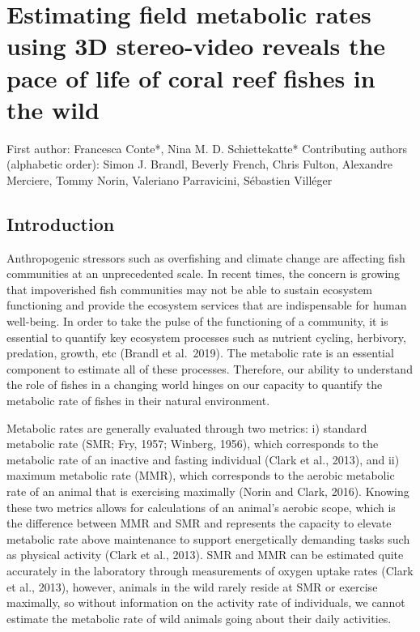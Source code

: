 \documentclass[12pt,a4paper]{article}
\begin{document}

\hypertarget{estimating-field-metabolic-rates-using-3d-stereo-video-reveals-the-pace-of-life-of-coral-reef-fishes-in-the-wild}{%
\section{Estimating field metabolic rates using 3D stereo-video reveals
the pace of life of coral reef fishes in the
wild}\label{estimating-field-metabolic-rates-using-3d-stereo-video-reveals-the-pace-of-life-of-coral-reef-fishes-in-the-wild}}

First author: Francesca Conte*, Nina M. D. Schiettekatte* Contributing
authors (alphabetic order): Simon J. Brandl, Beverly French, Chris
Fulton, Alexandre Merciere, Tommy Norin, Valeriano Parravicini,
Sébastien Villéger

\hypertarget{introduction}{%
\subsection{Introduction}\label{introduction}}

\noindent Anthropogenic stressors such as overfishing and climate change
are affecting fish communities at an unprecedented scale. In recent
times, the concern is growing that impoverished fish communities may not
be able to sustain ecosystem functioning and provide the ecosystem
services that are indispensable for human well-being. In order to take
the pulse of the functioning of a community, it is essential to quantify
key ecosystem processes such as nutrient cycling, herbivory, predation,
growth, etc (Brandl et al.~2019). The metabolic rate is an essential
component to estimate all of these processes. Therefore, our ability to
understand the role of fishes in a changing world hinges on our capacity
to quantify the metabolic rate of fishes in their natural environment.

\noindent Metabolic rates are generally evaluated through two metrics:
i) standard metabolic rate (SMR; Fry, 1957; Winberg, 1956), which
corresponds to the metabolic rate of an inactive and fasting individual
(Clark et al., 2013), and ii) maximum metabolic rate (MMR), which
corresponds to the aerobic metabolic rate of an animal that is
exercising maximally (Norin and Clark, 2016). Knowing these two metrics
allows for calculations of an animal's aerobic scope, which is the
difference between MMR and SMR and represents the capacity to elevate
metabolic rate above maintenance to support energetically demanding
tasks such as physical activity (Clark et al., 2013). SMR and MMR can be
estimated quite accurately in the laboratory through measurements of
oxygen uptake rates (Clark et al., 2013), however, animals in the wild
rarely reside at SMR or exercise maximally, so without information on
the activity rate of individuals, we cannot estimate the metabolic rate
of wild animals going about their daily activities.
\end{document}
